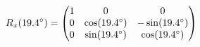 \documentclass[preview]{standalone}
\begin{document}
\begin{align*}
\special{dvisvgm:raw <g id='unique000'>}R_x(19.4^\circ) = \begin{pmatrix} 1 & 0 & 0 \\ 0 & \cos(19.4^\circ) & -\sin(19.4^\circ) \\ 0 & \sin(19.4^\circ) & \cos(19.4^\circ) \end{pmatrix}\special{dvisvgm:raw </g>}
\end{align*}
\end{document}
